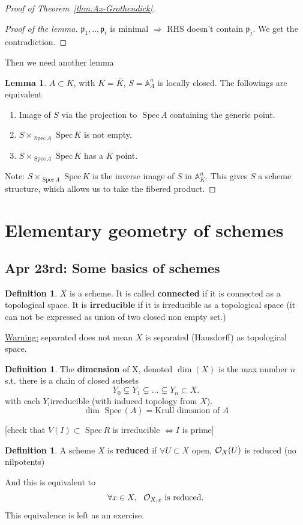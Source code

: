 \documentclass[11pt]{article}
\theoremstyle{definition}
\newtheorem{lemma}[thm]{Lemma}
\newtheorem{dfn}[thm]{Definition}
\newcommand{\spec}{\text{ Spec}\,}
\newcommand{\affn}{\mathbb A}
\newcommand{\scp}{{\mathfrak p}}
\newcommand{\calo}{{\cal O}}
\newcommand{\Lrta}{\Longrightarrow}
\newcommand{\Llrta}{\Longleftrightarrow}
\begin{document}
\begin{proof}[Proof of Theorem~\ref{thm:Ax-Grothendick}]
\begin{proof}[Proof of the lemma]
$\scp_1,..,\scp_t$ is minimal $\Lrta $ RHS doesn't contain $\scp_j$. We get the contradiction.
\end{proof}

Then we need another lemma
\begin{lemma}


$A\subset K$, with $ K=\overline{K}$, $S=\affn^n_A$ is locally closed. The followings are equivalent
\begin{enumerate}[label=(\arabic*)]
\item Image of $S$ via the projection to $\spec A$ containing the generic point.
\item $S\times_{\spec A}\spec K$ is not empty.
\item $S\times_{\spec A}\spec K$ has a $K$ point. 
\end{enumerate}
\end{lemma}

Note: $S\times_{\spec A}\spec K$ is the inverse image of $S$ in $\affn^n_K$. This gives  $S$ a scheme structure, which allows us to take the fibered product.
\end{proof}
\section{Elementary geometry of schemes}
\subsection{Apr 23rd: Some basics of schemes}
\begin{dfn}
$X$ is a scheme. It is called \textbf{connected} if it is connected as a topological space. It is \textbf{irreducible} if it is irreducible as a topological space (it can not be expressed as union of two closed non empty set.)
\end{dfn}
\underline{Warning:} separated does not mean $X$ is separated (Hausdorff) as topological space.

\begin{dfn}
The \textbf{dimension} of X, denoted $\dim(X)$ is the max number $n$ s.t. there is a chain of closed subsets
$$
Y_0\subsetneq Y_1\subsetneq ...\subsetneq Y_n \subset X.
$$ with each $Y_i$irreducible (with induced topology from $X$).
$$
\dim \spec (A)=\text{Krull dimsnion of $A$}
$$ 
\end{dfn}
[check that $V(I)\subset \spec R$ is irreducible $\Llrta I$ is prime] 

\begin{dfn}
A scheme $X$ is \textbf{reduced} if $\forall U\subset X$ open, $\calo_X(U)$ is reduced (no nilpotents)

And this is equivalent to 
$$
\forall x\in X,\ \  \calo_{X,x} \text{ is reduced.}
$$
This equivalence is left as an exercise.
\end{dfn}
\end{document}
